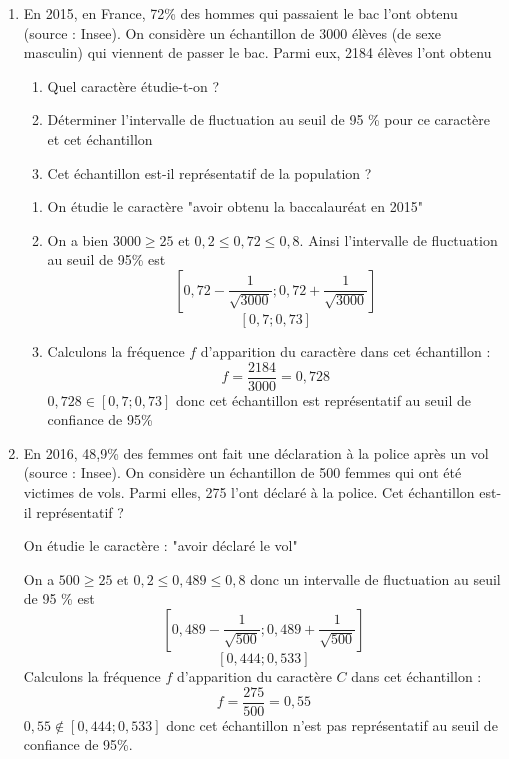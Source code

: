 \begin{exemples}
\begin{enumerate}
\item En 2015, en France, 72\% des hommes qui passaient le bac l'ont obtenu (source : Insee). On considère un échantillon de 3000 élèves (de sexe masculin) qui viennent de passer le bac. Parmi eux, 2184 élèves l'ont obtenu
\begin{enumerate}
\item Quel caractère étudie-t-on ?
\item Déterminer l'intervalle de fluctuation au seuil de 95 \% pour ce caractère et cet échantillon
\item Cet échantillon est-il représentatif de la population ? 
\end{enumerate}
\begin{enumerate}
\item On étudie le caractère "avoir obtenu la baccalauréat en 2015"
\item On a bien $3000 \geq 25$ et $0,2 \leq 0,72 \leq 0,8$. Ainsi l'intervalle de fluctuation au seuil de 95\% est 
$$\left[0,72 - \dfrac{1}{\sqrt{3000}};0,72 + \dfrac{1}{\sqrt{3000}}\right]$$
$$\left[0,7;0,73\right]$$
\item Calculons la fréquence $f$ d'apparition du caractère dans cet échantillon : 
$$f = \dfrac{2184}{3000} = 0,728$$
$0,728 \in [0,7;0,73]$ donc cet échantillon est représentatif au seuil de confiance de 95\%
\end{enumerate}
\item En 2016, 48,9\% des femmes ont fait une déclaration à la police après un vol (source : Insee). On considère un échantillon de 500 femmes qui ont été victimes de vols. Parmi elles, 275 l'ont déclaré à la police. Cet échantillon est-il représentatif ?\newline

On étudie le caractère : "avoir déclaré le vol"\newline

On a $500 \geq 25$ et $0,2 \leq 0,489 \leq 0,8$ donc un intervalle de fluctuation au seuil de 95 \% est  
$$\left[0,489 - \dfrac{1}{\sqrt{500}};0,489 + \dfrac{1}{\sqrt{500}}\right]$$
$$\left[0,444;0,533\right]$$
Calculons la fréquence $f$ d'apparition du caractère $C$ dans cet échantillon :
$$f = \dfrac{275}{500} = 0,55$$
$0,55 \notin [0,444;0,533]$ donc cet échantillon n'est pas représentatif au seuil de confiance de 95\%.
\end{enumerate}
\end{exemples}
